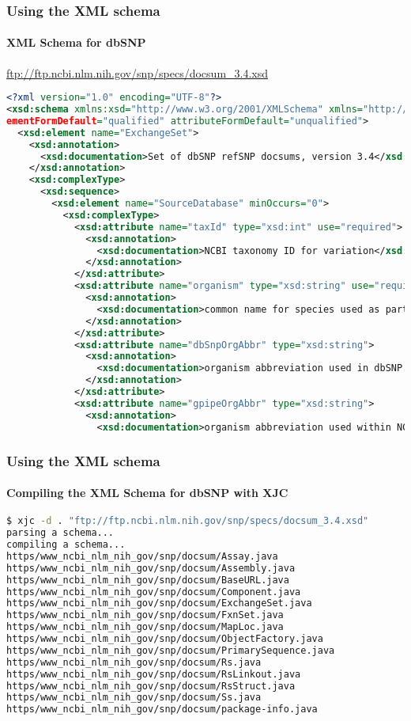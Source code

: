 \documentclass{beamer}
\begin{document}
\begin{frame}[fragile]
\frametitle{Using the XML schema}
\framesubtitle{XML Schema for dbSNP}
\url{ftp://ftp.ncbi.nlm.nih.gov/snp/specs/docsum_3.4.xsd}
\begin{lstlisting}[language=xml,basicstyle=\tiny,breaklines=false]
<?xml version="1.0" encoding="UTF-8"?>
<xsd:schema xmlns:xsd="http://www.w3.org/2001/XMLSchema" xmlns="http://www.ncbi.nlm.nih.gov/SNP/docsum" targetNamespace="http://www.ncbi.nlm.nih.gov/SNP/docsum" el
ementFormDefault="qualified" attributeFormDefault="unqualified">
  <xsd:element name="ExchangeSet">
    <xsd:annotation>
      <xsd:documentation>Set of dbSNP refSNP docsums, version 3.4</xsd:documentation>
    </xsd:annotation>
    <xsd:complexType>
      <xsd:sequence>
        <xsd:element name="SourceDatabase" minOccurs="0">
          <xsd:complexType>
            <xsd:attribute name="taxId" type="xsd:int" use="required">
              <xsd:annotation>
                <xsd:documentation>NCBI taxonomy ID for variation</xsd:documentation>
              </xsd:annotation>
            </xsd:attribute>
            <xsd:attribute name="organism" type="xsd:string" use="required">
              <xsd:annotation>
                <xsd:documentation>common name for species used as part of database name.</xsd:documentation>
              </xsd:annotation>
            </xsd:attribute>
            <xsd:attribute name="dbSnpOrgAbbr" type="xsd:string">
              <xsd:annotation>
                <xsd:documentation>organism abbreviation used in dbSNP. </xsd:documentation>
              </xsd:annotation>
            </xsd:attribute>
            <xsd:attribute name="gpipeOrgAbbr" type="xsd:string">
              <xsd:annotation>
                <xsd:documentation>organism abbreviation used within NCBI genome pipeline data dumps.</xsd:documentation>
\end{lstlisting}
\end{frame}

\begin{frame}[fragile]
\frametitle{Using the XML schema}
\framesubtitle{Compiling the XML Schema for dbSNP with XJC}

\begin{lstlisting}[language=bash,basicstyle=\tiny,breaklines=false]
$ xjc -d . "ftp://ftp.ncbi.nlm.nih.gov/snp/specs/docsum_3.4.xsd"
parsing a schema...
compiling a schema...
https/www_ncbi_nlm_nih_gov/snp/docsum/Assay.java
https/www_ncbi_nlm_nih_gov/snp/docsum/Assembly.java
https/www_ncbi_nlm_nih_gov/snp/docsum/BaseURL.java
https/www_ncbi_nlm_nih_gov/snp/docsum/Component.java
https/www_ncbi_nlm_nih_gov/snp/docsum/ExchangeSet.java
https/www_ncbi_nlm_nih_gov/snp/docsum/FxnSet.java
https/www_ncbi_nlm_nih_gov/snp/docsum/MapLoc.java
https/www_ncbi_nlm_nih_gov/snp/docsum/ObjectFactory.java
https/www_ncbi_nlm_nih_gov/snp/docsum/PrimarySequence.java
https/www_ncbi_nlm_nih_gov/snp/docsum/Rs.java
https/www_ncbi_nlm_nih_gov/snp/docsum/RsLinkout.java
https/www_ncbi_nlm_nih_gov/snp/docsum/RsStruct.java
https/www_ncbi_nlm_nih_gov/snp/docsum/Ss.java
https/www_ncbi_nlm_nih_gov/snp/docsum/package-info.java
\end{lstlisting}
\end{frame}
\end{document}
